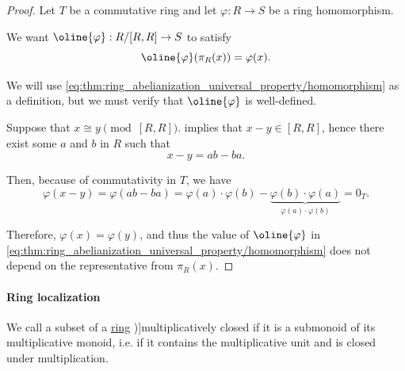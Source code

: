 \begin{proof}
  Let \( T \) be a commutative ring and let \( \varphi: R \to S \) be a ring homomorphism.

  We want \( \oline{\varphi}: R / [R, R] \to S \) to satisfy
  \begin{equation}\label{eq:thm:ring_abelianization_universal_property/homomorphism}
    \oline{\varphi}(\pi_R(x)) = \varphi(x).
  \end{equation}

  We will use \eqref{eq:thm:ring_abelianization_universal_property/homomorphism} as a definition, but we must verify that \( \oline{\varphi} \) is well-defined.

  Suppose that \( x \cong y \pmod {[R, R]} \).  implies that \( x - y \in [R, R] \), hence there exist some \( a \) and \( b \) in \( R \) such that
  \begin{equation*}
    x - y = ab - ba.
  \end{equation*}

  Then, because of commutativity in \( T \), we have
  \begin{equation*}
    \varphi(x - y)
    =
    \varphi(ab - ba)
    =
    \varphi(a) \cdot \varphi(b) - \underbrace{\varphi(b) \cdot \varphi(a)}_{\varphi(a) \cdot \varphi(b)}
    =
    0_T.
  \end{equation*}

  Therefore, \( \varphi(x) = \varphi(y) \), and thus the value of \( \oline{\varphi} \) in \eqref{eq:thm:ring_abelianization_universal_property/homomorphism} does not depend on the representative from \( \pi_R(x) \).
\end{proof}

\paragraph{Ring localization}

\begin{definition}\label{def:multiplicatively_closed_ring_subset}
  We call a subset of a \hyperref[def:ring]{ring} \term[bg=мултипликативно затворено множество (\cite[23]{КоцевСидеров2016КомутативнаАлгебра})]{multiplicatively closed} if it is a submonoid of its multiplicative monoid, i.e. if it contains the multiplicative unit and is closed under multiplication.
\end{definition}

